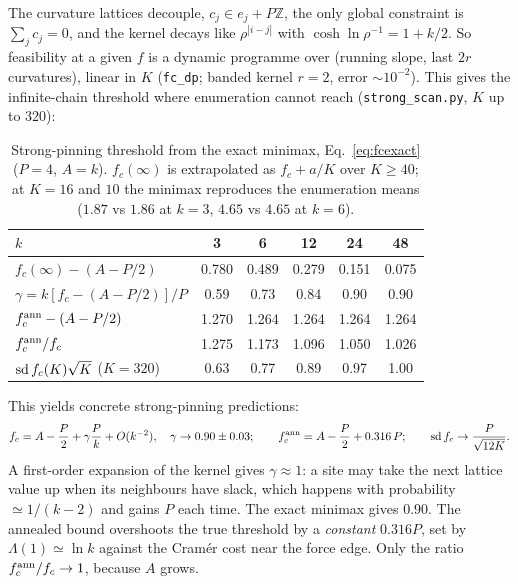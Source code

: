 \documentclass[10pt,a4paper]{article}
\begin{document}
The curvature lattices decouple, $c_j\in e_j+P\mathbb Z$, the only global constraint is $\sum_jc_j=0$, and the kernel decays like $\rho^{|i-j|}$ with $\cosh\ln\rho^{-1}=1+k/2$.
So feasibility at a given $f$ is a dynamic programme over (running slope, last $2r$ curvatures), linear in $K$ (\texttt{fc\_dp}; banded kernel $r=2$, error $\sim10^{-2}$).
This gives the infinite-chain threshold where enumeration cannot reach (\texttt{strong\_scan.py}, $K$ up to $320$):

\begin{table}[H]
\centering\footnotesize
\begin{tabular}{lccccc}
\toprule
$k$ & 3 & 6 & 12 & 24 & 48 \\
\midrule
$f_c(\infty)-(A-P/2)$ & 0.780 & 0.489 & 0.279 & 0.151 & 0.075 \\
$\gamma=k[f_c-(A-P/2)]/P$ & 0.59 & 0.73 & 0.84 & 0.90 & 0.90 \\
$f_c^{\rm ann}-(A-P/2)$ & 1.270 & 1.264 & 1.264 & 1.264 & 1.264 \\
$f_c^{\rm ann}/f_c$ & 1.275 & 1.173 & 1.096 & 1.050 & 1.026 \\
${\rm sd}\,f_c(K)\sqrt K$ ($K=320$) & 0.63 & 0.77 & 0.89 & 0.97 & 1.00 \\
\bottomrule
\end{tabular}
\caption{Strong-pinning threshold from the exact minimax, Eq.~\eqref{eq:fcexact} ($P=4$, $A=k$). $f_c(\infty)$ is extrapolated as $f_c+a/K$ over $K\ge40$; at $K=16$ and $10$ the minimax reproduces the enumeration means ($1.87$ vs $1.86$ at $k=3$, $4.65$ vs $4.65$ at $k=6$).}
\label{tab:strong}
\end{table}

This yields concrete strong-pinning predictions:
\begin{equation}
f_c=A-\frac P2+\gamma\frac Pk+O(k^{-2}),\quad\gamma\to0.90\pm0.03;\qquad
f_c^{\rm ann}=A-\frac P2+0.316\,P;\qquad
{\rm sd}\,f_c\to\frac{P}{\sqrt{12K}} .
\end{equation}
A first-order expansion of the kernel gives $\gamma\approx1$: a site may take the next lattice value up when its neighbours have slack, which happens with probability $\simeq1/(k-2)$ and gains $P$ each time. The exact minimax gives $0.90$.
The annealed bound overshoots the true threshold by a \emph{constant} $0.316P$, set by $\Lambda(1)\simeq\ln k$ against the Cramér cost near the force edge. Only the ratio $f_c^{\rm ann}/f_c\to1$, because $A$ grows.
\end{document}
